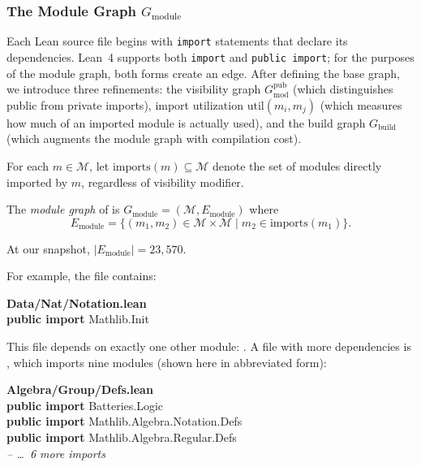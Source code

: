 \subsubsection{The Module Graph $G_{\mathrm{module}}$}
\label{sec:import-graph}

Each Lean source file begins with \texttt{import} statements that declare its dependencies. Lean~4 supports both \texttt{import} and \texttt{public import}; for the purposes of the module graph, both forms create an edge. After defining the base graph, we introduce three refinements: the visibility graph $G_{\mathrm{mod}}^{\mathrm{pub}}$ (which distinguishes public from private imports), import utilization $\mathrm{util}(m_i, m_j)$ (which measures how much of an imported module is actually used), and the build graph $G_{\mathrm{build}}$ (which augments the module graph with compilation cost).

\begin{definition}
\label{def:import-set}
For each $m \in \mathcal{M}$, let $\mathrm{imports}(m) \subseteq \mathcal{M}$ denote the set of modules directly imported by $m$, regardless of visibility modifier.
\end{definition}

\begin{definition}\label{def:module-graph}
The \emph{module graph} of  is $G_{\mathrm{module}} = (\mathcal{M}, E_{\mathrm{module}})$ where
\[
  E_{\mathrm{module}} = \{(m_1, m_2) \in \mathcal{M} \times \mathcal{M} \mid m_2 \in \mathrm{imports}(m_1)\}.
\]
\end{definition}

\noindent At our snapshot, $|E_{\mathrm{module}}| = 23{,}570$.

For example, the file  contains:

\begin{codebox}
\textsf{\bfseries\color{blue!60!black}Data/Nat/Notation.lean}\\[2pt]
\textbf{public import} \textcolor{blue!60!black}{Mathlib.Init}
\end{codebox}

\noindent
This file depends on exactly one other module: .
A file with more dependencies is , which imports nine modules (shown here in abbreviated form):

\begin{codebox}
\textsf{\bfseries\color{blue!60!black}Algebra/Group/Defs.lean}\\[2pt]
\textbf{public import} \textcolor{blue!60!black}{Batteries.Logic}\\
\textbf{public import} \textcolor{blue!60!black}{Mathlib.Algebra.Notation.Defs}\\
\textbf{public import} \textcolor{blue!60!black}{Mathlib.Algebra.Regular.Defs}\\
\hspace{1.5em}\textit{\color{gray}-- \ldots\ 6 more imports}
\end{codebox}

